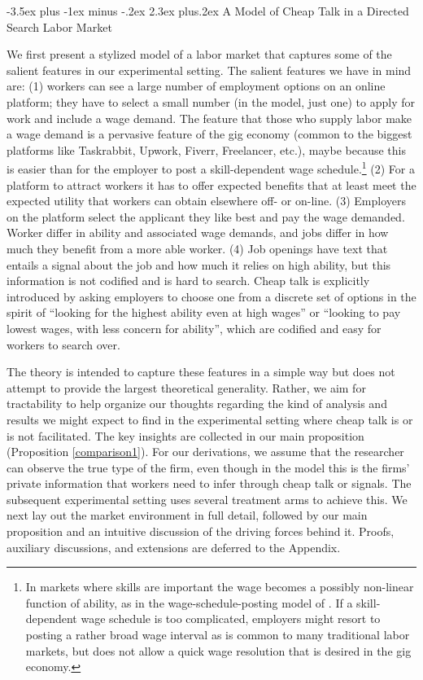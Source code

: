 \documentclass[12pt]{article}
\makeatletter
\renewcommand{\section}{%
  \@startsection{section}{1}{\z@}%
  {-3.5ex plus -1ex minus -.2ex}%
  {2.3ex plus.2ex}%
  {\normalfont\Large\bfseries}%
}
\makeatother
\begin{document}
\section{A Model of Cheap Talk in a Directed Search Labor Market} \label{sec:theory}

We first present a stylized model of a labor market that captures some of the salient features in our experimental setting. The salient features we have in mind are: (1) workers can see a large number of employment options on an online platform; they have to select a small number (in the model, just one) to apply for work and include a wage demand. The feature that those who supply labor make a wage demand is a pervasive feature of the gig economy (common to the biggest platforms like Taskrabbit, Upwork, Fiverr, Freelancer, etc.), maybe because this is easier than for the employer to post a skill-dependent wage schedule.\footnote{In markets where skills are important the wage becomes a possibly non-linear function of ability, as in the wage-schedule-posting model of \cite{shimer_2005}. If a skill-dependent wage schedule is too complicated, employers might resort to posting a rather broad wage interval as is common to many traditional labor markets, but does not allow a quick wage resolution that is desired in the gig economy.} (2) For a platform to attract workers it has to offer expected benefits that at least meet the expected utility that workers can obtain elsewhere off- or on-line. (3) Employers on the platform select the applicant they like best and pay the wage demanded.
Worker differ in ability and associated wage demands, and jobs differ in how much they benefit from a more able worker.
(4) Job openings have text that entails a signal about the job and how much it relies on high ability, but this information is not codified and is hard to search. Cheap talk is explicitly introduced by asking employers to choose one from a discrete set of options in the spirit of ``looking for the highest ability even at high wages'' or ``looking to pay lowest wages, with less concern for ability'', which are codified and easy for workers to search over. 

The theory is intended to capture these features in a simple way but does not attempt to provide the largest theoretical generality.
Rather, we aim for tractability to help organize our thoughts regarding the kind of analysis and results we might expect to find in the experimental setting where cheap talk is or is not facilitated. The key insights are collected in our main proposition (Proposition \ref{comparison1}). For our derivations, we assume that the researcher can observe the true type of the firm, even though in the model this is the firms' private information that workers need to infer through cheap talk or signals. The subsequent experimental setting uses several treatment arms to achieve this. We next lay out the market environment in full detail, followed by our main proposition and an intuitive discussion of the driving forces behind it. Proofs, auxiliary discussions, and extensions are deferred to the Appendix.
\end{document}

